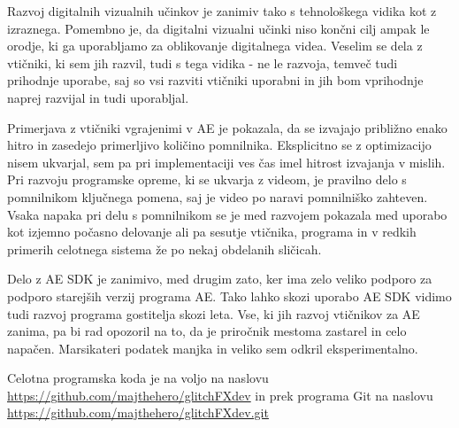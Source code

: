 \documentclass[a4paper, 12pt]{book}
\begin{document}
Razvoj digitalnih vizualnih učinkov je zanimiv tako s tehnološkega vidika kot z izraznega.
Pomembno je, da digitalni vizualni učinki niso končni cilj ampak le orodje, ki ga uporabljamo za oblikovanje digitalnega videa.
Veselim se dela z vtičniki, ki sem jih razvil, tudi s tega vidika - ne le razvoja, temveč tudi prihodnje uporabe,
saj so vsi razviti vtičniki uporabni in jih bom vprihodnje naprej razvijal in tudi uporabljal.

Primerjava z vtičniki vgrajenimi v AE je pokazala, da se izvajajo približno enako hitro in zasedejo primerljivo količino pomnilnika.
Eksplicitno se z optimizacijo nisem ukvarjal, sem pa pri implementaciji ves čas imel hitrost izvajanja v mislih.
Pri razvoju programske opreme, ki se ukvarja z videom, je pravilno delo s pomnilnikom ključnega pomena,
saj je video po naravi pomnilniško zahteven.
Vsaka napaka pri delu s pomnilnikom se je med razvojem pokazala med uporabo kot izjemno počasno delovanje ali pa sesutje vtičnika,
programa in v redkih primerih celotnega sistema že po nekaj obdelanih sličicah.

Delo z AE SDK je zanimivo, med drugim zato, ker ima zelo veliko podporo za podporo starejših verzij programa AE.
Tako lahko skozi uporabo AE SDK vidimo tudi razvoj programa gostitelja skozi leta.
Vse, ki jih razvoj vtičnikov za AE zanima, pa bi rad opozoril na to, da je priročnik \cite{aesdk} mestoma zastarel in celo napačen.
Marsikateri podatek manjka in veliko sem odkril eksperimentalno.

Celotna programska koda je na voljo na naslovu \url{https://github.com/majthehero/glitchFXdev} in prek programa Git na naslovu \url{https://github.com/majthehero/glitchFXdev.git}

\nocite{manovichnewmedia}


\ \\
\clearpage
{}


\end{document}

